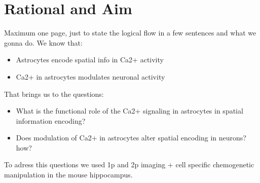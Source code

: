 
\chapter{Rational and Aim} %

\label{Chapter2} %




Maximum one page, just to state the logical flow in a few sentences and what we gonna do.
We know that:
\begin{itemize}
    \item Astrocytes encode spatial info in Ca2+ activity
    \item Ca2+ in astrocytes modulates neuronal activity
\end{itemize}
That brings us to the questions:
\begin{itemize}
    \item What is the functional role of the Ca2+ signaling in astrocytes in spatial information encoding?
    \item Does modulation of Ca2+ in astrocytes alter spatial encoding in neurons? how? 
\end{itemize}
To adress this questions we used 1p and 2p imaging + cell specific chemogenetic manipulation in the mouse hippocampus.


